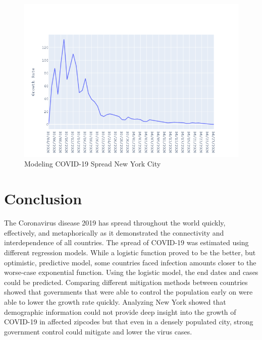 \documentclass{homework}
\begin{document}
\begin{figure}[H]
  \centering
  \includegraphics[scale=0.45]{task5/task5_growthrate.png}
  \caption{Modeling COVID-19 Spread New York City}
\end{figure}


\newpage
\section{Conclusion}

The Coronavirus disease 2019 has spread throughout the world quickly, effectively, and metaphorically as it demonstrated the connectivity and interdependence of all countries. The spread of COVID-19 was estimated using different regression models. While a logistic function proved to be the better, but optimistic, predictive model, some countries faced infection amounts closer to the worse-case exponential function. Using the logistic model, the end dates and cases could be predicted. Comparing different mitigation methods between countries showed that governments that were able to control the population early on were able to lower the growth rate quickly. Analyzing New York showed that demographic information could not provide deep insight into the growth of COVID-19 in affected zipcodes but that even in a densely populated city, strong government control could mitigate and lower the virus cases. \\

\newpage
\printbibliography[heading=bibintoc,title={References}]
\end{document}
